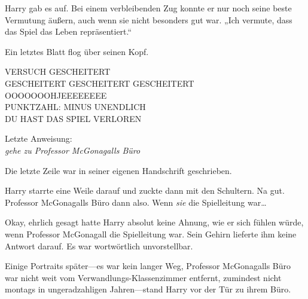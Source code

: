 Harry gab es auf. Bei einem verbleibenden Zug konnte er nur noch seine beste Vermutung äußern, auch wenn sie nicht besonders gut war. „Ich vermute, dass das Spiel das Leben repräsentiert.“

Ein letztes Blatt flog über seinen Kopf.

\begin{writtenNote}\centering
\scshape
%
\uppercase{
Versuch gescheitert\\
Gescheitert Gescheitert Gescheitert\\
Ooooooohjeeeeeeee\\
Punktzahl: Minus Unendlich\\
\MakeUppercase{Du hast das Spiel verloren}}

Letzte Anweisung:\\
\emph{gehe zu Professor McGonagalls Büro}
\end{writtenNote}

Die letzte Zeile war in seiner eigenen Handschrift geschrieben.

Harry starrte eine Weile darauf und zuckte dann mit den Schultern. Na gut. Professor McGonagalls Büro dann also. Wenn \emph{sie} die Spielleitung war…

Okay, ehrlich gesagt hatte Harry absolut keine Ahnung, wie er sich fühlen würde, wenn Professor McGonagall die Spielleitung war. Sein Gehirn lieferte ihm keine Antwort darauf. Es war wortwörtlich unvorstellbar.

Einige Portraits später—es war kein langer Weg, Professor McGonagalls Büro war nicht weit vom Verwandlungs-Klassenzimmer entfernt, zumindest nicht montags in ungeradzahligen Jahren—stand Harry vor der Tür zu ihrem Büro.

